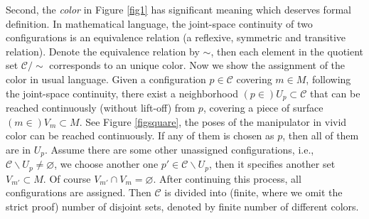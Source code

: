 \documentclass[journal]{IEEEtran}
\begin{document}
Second, the \textit{color} in Figure \ref{fig1} has significant meaning which deserves formal definition. In mathematical language, the joint-space continuity of two configurations is an equivalence relation (a reflexive, symmetric and transitive relation). Denote the equivalence relation by $\sim$, then each element in the quotient set $\mathscr{C}/\sim$ corresponds to an unique color. 
Now we show the assignment of the color in usual language. 
Given a configuration $p \in \mathscr{C}$ covering $m\in M$, following the joint-space continuity, there exist a neighborhood $(p\in)U_p\subset \mathscr{C}$ that can be reached continuously (without lift-off) from $p$, covering a piece of surface $(m\in )V_{m}\subset M$. 
See Figure \ref{figsquare}, the poses of the manipulator in vivid color can be reached continuously. If any of them is chosen as $p$, then all of them are in $U_p$. 
Assume there are some other unassigned configurations, i.e., $\mathscr{C}\backslash U_p\neq \varnothing$, we choose another one $p'\in \mathscr{C}\backslash U_p$, then it specifies another set $V_{m'}\subset M$. Of course $V_{m'} \cap V_{m} = \varnothing$.
After continuing this process, all configurations are assigned. Then $\mathscr{C}$ is divided into (finite, where we omit the strict proof) number of disjoint sets, denoted by finite number of different colors. 
\end{document}
